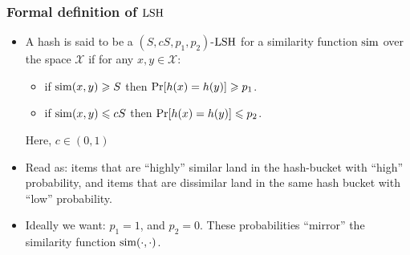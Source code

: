 \documentclass{beamer}
\begin{document}
\begin{frame}
\frametitle{Formal definition of $\mathrm{LSH}$}
\begin{itemize}
\item A hash is said to be a $(S, cS, p_1, p_2)$-$\mathrm{LSH}$ for a similarity function $\mathrm{sim}$ over the space 
$\mathcal{X}$ if for any $x, y\in\mathcal{X}$:
\begin{itemize}
\item if $\mathrm{sim}(x, y)\geqslant S$ then $\Pr[h(x)=h(y)]\geqslant p_1$.
\item if $\mathrm{sim}(x, y)\leqslant cS$ then $\Pr[h(x)=h(y)]\leqslant p_2$.
\end{itemize}
Here, $c \in (0, 1)$ \pause
\item Read as: items that are ``highly'' similar land in the  hash-bucket with ``high'' probability, and items that are dissimilar land in the same hash bucket with ``low'' probability.
\item Ideally we want: $p_1 = 1$, and $p_2 = 0$. These probabilities ``mirror'' the similarity function $\mathrm{sim}(\cdot, \cdot)$.
\end{itemize}
\end{frame}
\end{document}
